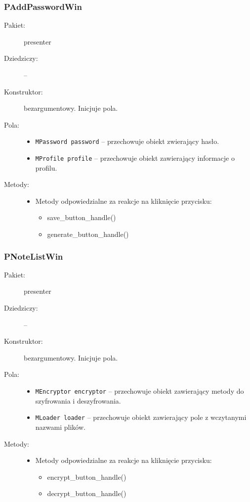 \documentclass[a4paper]{article}
\newcommand{\prog}{\texttt}
\begin{document}
\subsubsection{PAddPasswordWin}
\begin{description}
    \item[Pakiet:] presenter
    \item[Dziedziczy:] --
    \item[Konstruktor:] bezargumentowy. Inicjuje pola.
    \item[Pola:] \hfill
    \begin{itemize}
        \item \prog{MPassword password} -- przechowuje obiekt zwierający hasło.
        \item \prog{MProfile profile} -- przechowuje obiekt zawierający informacje o profilu.
    \end{itemize}
    \item[Metody:] \hfill
    \begin{itemize}
        \item Metody odpowiedzialne za reakcje na kliknięcie przycisku:
        \begin{itemize}
            \item save\_button\_handle()
            \item generate\_button\_handle()
        \end{itemize}
    \end{itemize}
\end{description}

\subsubsection{PNoteListWin}
\begin{description}
    \item[Pakiet:] presenter
    \item[Dziedziczy:] --
    \item[Konstruktor:] bezargumentowy. Inicjuje pola.
    \item[Pola:] \hfill
    \begin{itemize}
        \item \prog{MEncryptor encryptor} -- przechowuje obiekt zawierający metody do szyfrowania i deszyfrowania.
        \item \prog{MLoader loader} -- przechowuje obiekt zawierający pole z wczytanymi nazwami plików.
    \end{itemize}
    \item[Metody:] \hfill
    \begin{itemize}
        \item Metody odpowiedzialne za reakcje na kliknięcie przycisku:
        \begin{itemize}
            \item encrypt\_button\_handle()
            \item decrypt\_button\_handle()
        \end{itemize}
    \end{itemize}
\end{description}
\end{document}
